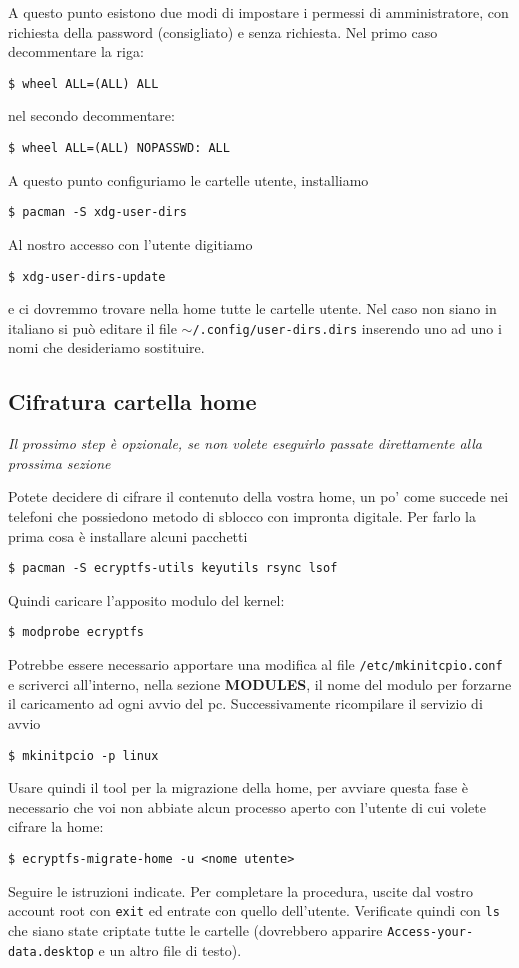 \documentclass[twoside,italian]{book}
\newcommand{\code}[1]{\texttt{#1}}
\begin{document}
    A questo punto esistono due modi di impostare i permessi di amministratore, con richiesta della password (consigliato) e senza richiesta.
    Nel primo caso decommentare la riga:
    \begin{lstlisting}
$ wheel ALL=(ALL) ALL
    \end{lstlisting}
    nel secondo decommentare: 
    \begin{lstlisting}
$ wheel ALL=(ALL) NOPASSWD: ALL
    \end{lstlisting}

    A questo punto configuriamo le cartelle utente, installiamo 
    \begin{lstlisting}
$ pacman -S xdg-user-dirs
    \end{lstlisting}
    Al nostro accesso con l'utente digitiamo 
    \begin{lstlisting}
$ xdg-user-dirs-update
    \end{lstlisting}
    e ci dovremmo trovare nella home tutte le cartelle utente. Nel caso non siano in italiano si può editare il file \code{$\sim$/.config/user-dirs.dirs} inserendo uno ad uno i nomi che desideriamo sostituire.
    
    \subsection{Cifratura cartella home}
    \emph{Il prossimo step è opzionale, se non volete eseguirlo passate direttamente alla prossima sezione}
    
    Potete decidere di cifrare il contenuto della vostra home, un po' come succede nei telefoni che possiedono metodo di sblocco con impronta digitale. Per farlo la prima cosa è installare alcuni pacchetti 
    \begin{lstlisting}
$ pacman -S ecryptfs-utils keyutils rsync lsof
    \end{lstlisting}
    Quindi caricare l'apposito modulo del kernel:
    \begin{lstlisting}
$ modprobe ecryptfs
    \end{lstlisting}
    Potrebbe essere necessario apportare una modifica al file \code{/etc/mkinitcpio.conf} e scriverci all'interno, nella sezione \textbf{MODULES}, il nome del modulo per forzarne il caricamento ad ogni avvio del pc. Successivamente ricompilare il servizio di avvio 
    \begin{lstlisting}
$ mkinitpcio -p linux
    \end{lstlisting}
    Usare quindi il tool per la migrazione della home, per avviare questa fase è necessario che voi non abbiate alcun processo aperto con l'utente di cui volete cifrare la home: 
    \begin{lstlisting}
$ ecryptfs-migrate-home -u <nome utente>
    \end{lstlisting}
    Seguire le istruzioni indicate. Per completare la procedura, uscite dal vostro account root con \code{exit} ed entrate con quello dell'utente. Verificate quindi con \code{ls} che siano state criptate tutte le cartelle (dovrebbero apparire \code{Access-your-data.desktop} e un altro file di testo).
\end{document}
